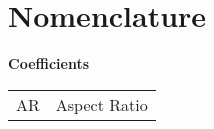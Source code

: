 \documentclass[conf]{new-aiaa}
\begin{document}
\section{Nomenclature}
\hspace{-0.5in}\textbf{Coefficients}
{\renewcommand\arraystretch{1.0}
\noindent\begin{longtable*}{@{}l @{\quad=\quad} l@{}}
    AR & Aspect Ratio \\

\end{longtable*}}
\end{document}
